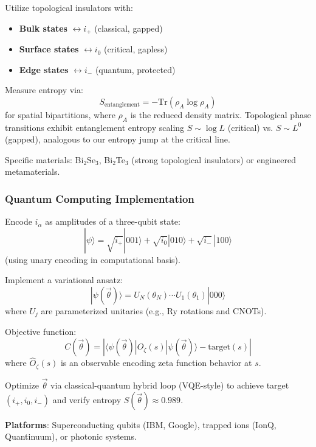 \documentclass[12pt]{article}
\theoremstyle{plain}
\theoremstyle{definition}
\begin{document}
\begin{proposal}\label{proposal:topological}
Utilize topological insulators with:
\begin{itemize}
\item \textbf{Bulk states} $\leftrightarrow i_+$ (classical, gapped)
\item \textbf{Surface states} $\leftrightarrow i_0$ (critical, gapless)
\item \textbf{Edge states} $\leftrightarrow i_-$ (quantum, protected)
\end{itemize}

Measure entropy via:
$$S_{\text{entanglement}} = -\text{Tr}(\rho_A \log \rho_A)$$
for spatial bipartitions, where $\rho_A$ is the reduced density matrix. Topological phase transitions exhibit entanglement entropy scaling $S \sim \log L$ (critical) vs. $S \sim L^0$ (gapped), analogous to our entropy jump at the critical line.

Specific materials: Bi$_2$Se$_3$, Bi$_2$Te$_3$ (strong topological insulators) or engineered metamaterials.
\end{proposal}

\subsubsection{Quantum Computing Implementation}

\begin{proposal}\label{proposal:vqa}
Encode $i_\alpha$ as amplitudes of a three-qubit state:
$$|\psi\rangle = \sqrt{i_+} |001\rangle + \sqrt{i_0} |010\rangle + \sqrt{i_-} |100\rangle$$
(using unary encoding in computational basis).

Implement a variational ansatz:
$$|\psi(\vec{\theta})\rangle = U_N(\theta_N) \cdots U_1(\theta_1) |000\rangle$$
where $U_j$ are parameterized unitaries (e.g., Ry rotations and CNOTs).

Objective function:
$$C(\vec{\theta}) = \left| \langle \psi(\vec{\theta}) | \hat{O}_{\zeta}(s) | \psi(\vec{\theta}) \rangle - \text{target}(s) \right|$$
where $\hat{O}_{\zeta}(s)$ is an observable encoding zeta function behavior at $s$.

Optimize $\vec{\theta}$ via classical-quantum hybrid loop (VQE-style) to achieve target $(i_+, i_0, i_-)$ and verify entropy $S(\vec{\theta}) \approx 0.989$.

\textbf{Platforms}: Superconducting qubits (IBM, Google), trapped ions (IonQ, Quantinuum), or photonic systems.
\end{proposal}
\end{document}

